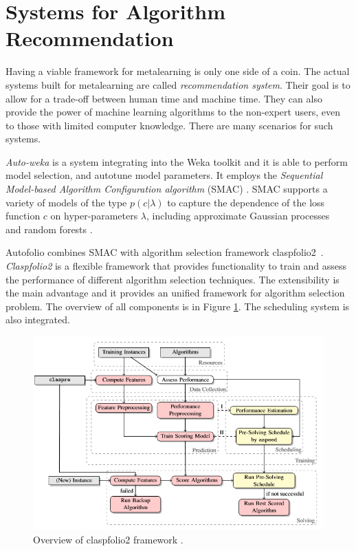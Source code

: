 \section{Systems for Algorithm Recommendation}
\label{section:recommenderSystems}
Having a viable framework for metalearning is only one side of a coin. The actual systems built for metalearning are called \emph{recommendation system}. Their goal is to allow for a trade-off between human time and machine time. They can also provide the power of machine learning algorithms to the non-expert users, even to those with limited computer knowledge. There are many scenarios for such systems.

\emph{Auto-weka} \cite{autoWeka} is a system integrating into the Weka toolkit \cite{weka} and it is able to perform model selection, and autotune model parameters. It employs the \emph{Sequential Model-based Algorithm Configuration algorithm} (SMAC) \cite{autoWekaSMAC}. SMAC supports a variety of models of the type $p(c| \lambda)$ to capture the dependence of the loss function $c$ on hyper-parameters $\lambda$, including approximate Gaussian processes~\cite{gaussianProcesses} and random forests \cite{randomForests}. 

Autofolio \cite{FrankHutterAutomaticallyConfiguredAlgorithmSelector} combines SMAC with algorithm selection framework claspfolio2~\cite{claspfolio2}. \emph{Claspfolio2} is a flexible framework that provides functionality to train and assess the performance of different algorithm selection techniques. The extensibility is the main advantage and it provides an unified framework for algorithm selection problem. The overview of all components is in Figure \ref{fig:claspfolio2}. The scheduling system is also integrated.

\begin{figure}
	\includegraphics[width=14cm]{Images/claspfolioSchema.png}
	\centering
	\caption{Overview of claspfolio2 framework \cite{claspfolio2}.}
	\label{fig:claspfolio2}	
\end{figure}

